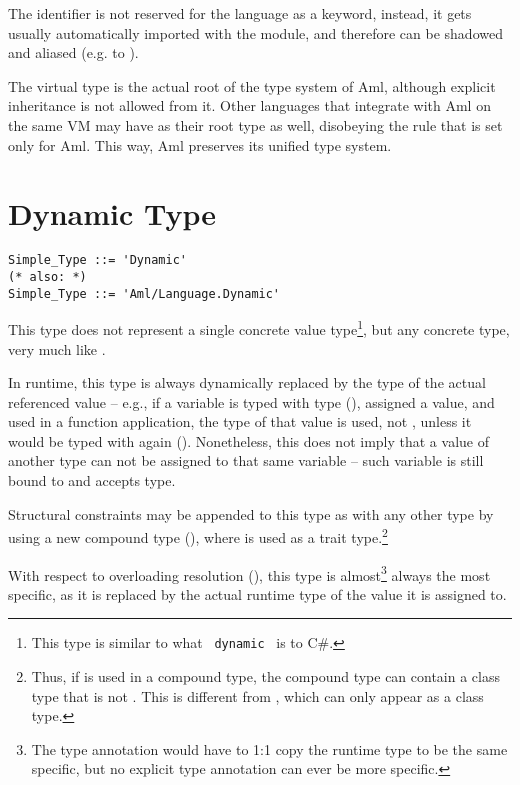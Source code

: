 The  identifier is not reserved for the language as a keyword, instead, it gets usually automatically imported with the  module, and therefore can be shadowed and aliased (e.g. to ). 

The  virtual type is the actual root of the type system of Aml, although explicit inheritance is not allowed from it. Other languages that integrate with Aml on the same VM may have  as their root type as well, disobeying the rule that is set only for Aml. This way, Aml preserves its unified type system. 





\section{Dynamic Type}
\label{sec:dynamic-type}

\grammar\begin{lstlisting}[morekeywords={Dynamic},deletekeywords={also}]
Simple_Type ::= 'Dynamic'
(* also: *)
Simple_Type ::= 'Aml/Language.Dynamic'
\end{lstlisting}

This type does not represent a single concrete value type\footnote{This type is similar to what ~\lstinline[language={[Sharp]C}]!dynamic!~ is to C\#.}, but any concrete type, very much like . 

In runtime, this type is always dynamically replaced by the type of the actual referenced value -- e.g., if a variable is typed with  type (), assigned a value, and used in a function application, the type of that value is used, not , unless it would be typed with  again (). Nonetheless, this does not imply that a value of another type can not be assigned to that same variable -- such variable is still bound to  and accepts  type. 

Structural constraints may be appended to this type as with any other type by using a new compound type (), where  is used as a trait type.\footnote{Thus, if  is used in a compound type, the compound type can contain a class type that is not . This is different from , which can only appear as a class type.}

With respect to overloading resolution (), this type is almost\footnote{The type annotation would have to 1:1 copy the runtime type to be the same specific, but no explicit type annotation can ever be more specific.} always the most specific, as it is replaced by the actual runtime type of the value it is assigned to. 

